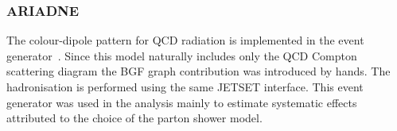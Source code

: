 \subsubsection{ARIADNE}
The colour-dipole pattern for QCD radiation is implemented in the \ariadne event generator~\cite{ariadne}. Since this model naturally includes only the QCD Compton scattering diagram the BGF graph contribution was introduced by hands. The hadronisation is performed using the same JETSET interface. This event generator was used in the analysis mainly to estimate systematic effects attributed to the choice of the parton shower model.
%